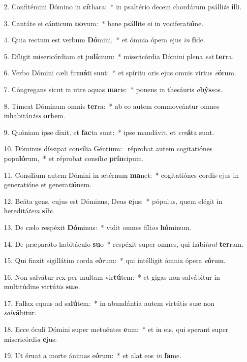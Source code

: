 2. Confitémini Dómino in \textbf{cí}thara:~*  in psaltério decem chordárum psálli\textit{te} \textbf{il}li.\

3. Cantáte ei cánticum \textbf{no}vum:~*  bene psállite ei in vocifera\textit{ti}\textbf{ó}ne.\

4. Quia rectum est verbum \textbf{Dó}mini,~*  et ómnia ópera ejus \textit{in} \textbf{fi}de.\

5. Díligit misericórdiam et ju\textbf{dí}cium:~*  misericórdia Dómini plena \textit{est} \textbf{ter}ra.\

6. Verbo Dómini cæli fir\textbf{má}ti sunt:~*  et spíritu oris ejus omnis virtus \textit{e}\textbf{ó}rum.\

7. Cóngregans sicut in utre aquas \textbf{ma}ris:~*  ponens in thesáuris \textit{a}\textbf{býs}sos.\

8. Tímeat Dóminum omnis \textbf{ter}ra:~*  ab eo autem commoveántur omnes inhabitán\textit{tes} \textbf{or}bem.\

9. Quóniam ipse dixit, et \textbf{fac}ta sunt:~*  ipse mandávit, et \textit{cre}\textbf{á}ta sunt.\

10. Dóminus díssipat consília Géntium: \dag\  réprobat autem cogitatiónes popu\textbf{ló}rum,~*  et réprobat consíli\textit{a} \textbf{prín}cipum.\

11. Consílium autem Dómini in ætérnum \textbf{ma}net:~*  cogitatiónes cordis ejus in generatióne et genera\textit{ti}\textbf{ó}nem.\

12. Beáta gens, cujus est Dóminus, Deus \textbf{e}jus:~*  pópulus, quem elégit in hereditá\textit{tem} \textbf{si}bi.\

13. De cælo respéxit \textbf{Dó}minus:~*  vidit omnes fíli\textit{os} \textbf{hó}minum.\

14. De præparáto habitáculo \textbf{su}o~*  respéxit super omnes, qui hábi\textit{tant} \textbf{ter}ram.\

15. Qui finxit sigillátim corda e\textbf{ó}rum:~*  qui intélligit ómnia ópera \textit{e}\textbf{ó}rum.\

16. Non salvátur rex per multam vir\textbf{tú}tem:~*  et gigas non salvábitur in multitúdine virtú\textit{tis} \textbf{su}æ.\

17. Fallax equus ad sa\textbf{lú}tem:~*  in abundántia autem virtútis suæ non \textit{sal}\textbf{vá}bitur.\

18. Ecce óculi Dómini super metuéntes \textbf{e}um:~*  et in eis, qui sperant super misericórdi\textit{a} \textbf{e}jus:\

19. Ut éruat a morte ánimas e\textbf{ó}rum:~*  et alat eos \textit{in} \textbf{fa}me.\

